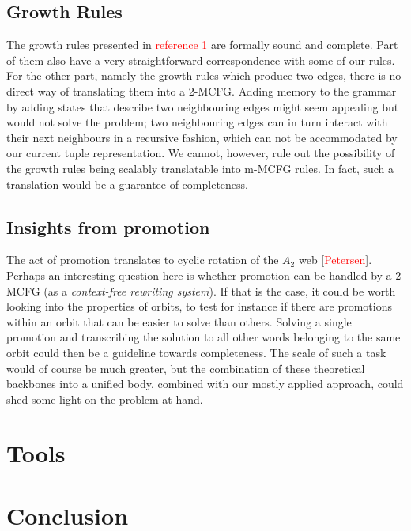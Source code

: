 \documentclass[nonatbib,numbers,10pt]{sigplanconf}
\newcommand\todo[1]{\textcolor{red}{#1}}
\begin{document}
\subsection{Growth Rules}
The growth rules presented in \todo{reference 1} are formally sound and complete. Part of them also have a very straightforward correspondence with some of our rules. For the other part, namely the growth rules which produce two edges, there is no direct way of translating them into a 2-MCFG. Adding memory to the grammar by adding states that describe two neighbouring edges might seem appealing but would not solve the problem; two neighbouring edges can in turn interact with their next neighbours in a recursive fashion, which can not be accommodated by our current tuple representation. We cannot, however, rule out the possibility of the growth rules being scalably translatable into m-MCFG rules. In fact, such a translation would be a guarantee of completeness.
\subsection{Insights from promotion}
The act of promotion translates to cyclic rotation of the $A_2$ web [\todo{Petersen}]. Perhaps an interesting question here is whether promotion can be handled by a 2-MCFG (as a \textit{context-free rewriting system}). If that is the case, it could be worth looking into the properties of orbits, to test for instance if there are promotions within an orbit that can be easier to solve than others. Solving a single promotion and transcribing the solution to all other words belonging to the same orbit could then be a guideline towards completeness. The scale of such a task would of course be much greater, but the combination of these theoretical backbones into a unified body, combined with our mostly applied approach, could shed some light on the problem at hand.

\section{Tools}
\section{Conclusion}
\end{document}
